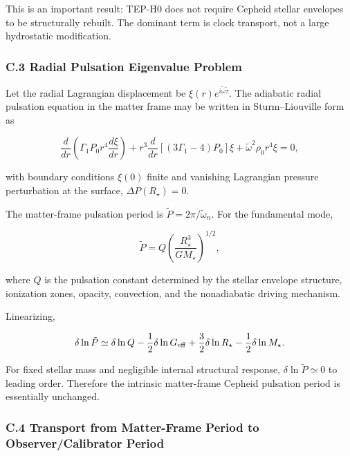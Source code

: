 \documentclass[
]{article}
\begin{document}
This is an important result: TEP-H0 does not require Cepheid stellar
envelopes to be structurally rebuilt. The dominant term is clock
transport, not a large hydrostatic modification.

\subsubsection{C.3 Radial Pulsation Eigenvalue
Problem}\label{c.3-radial-pulsation-eigenvalue-problem}

Let the radial Lagrangian displacement be
\(\xi(r)e^{i\tilde\omega\tilde\tau}\). The adiabatic radial pulsation
equation in the matter frame may be written in Sturm--Liouville form as

\begin{equation}
\frac{d}{dr}\left(\Gamma_1 P_0 r^4 \frac{d\xi}{dr}\right) + r^3\frac{d}{dr}\left[(3\Gamma_1 - 4)P_0\right]\xi + \tilde\omega^2\rho_0 r^4 \xi = 0 ,
\end{equation}

with boundary conditions \(\xi(0)\) finite and vanishing Lagrangian
pressure perturbation at the surface, \(\Delta P(R_\star) = 0\).

The matter-frame pulsation period is \(\tilde P = 2\pi/\tilde\omega_n\).
For the fundamental mode,

\begin{equation}
\tilde P = Q\left(\frac{R_\star^3}{GM_\star}\right)^{1/2},
\end{equation}

where \(Q\) is the pulsation constant determined by the stellar envelope
structure, ionization zones, opacity, convection, and the nonadiabatic
driving mechanism.

Linearizing,

\begin{equation}
\delta\ln\tilde P \simeq \delta\ln Q - \frac{1}{2}\delta\ln G_{\rm eff} + \frac{3}{2}\delta\ln R_\star - \frac{1}{2}\delta\ln M_\star .
\end{equation}

For fixed stellar mass and negligible internal structural response,
\(\delta\ln\tilde P \simeq 0\) to leading order. Therefore the intrinsic
matter-frame Cepheid pulsation period is essentially unchanged.

\subsubsection{C.4 Transport from Matter-Frame Period to
Observer/Calibrator
Period}\label{c.4-transport-from-matter-frame-period-to-observercalibrator-period}
\end{document}
